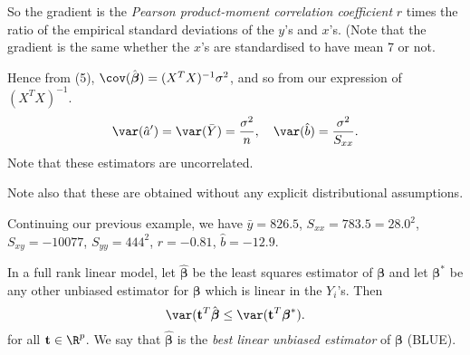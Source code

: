 \documentclass[a4paper]{article}
\begin{document}
So the gradient is the \emph{Pearson product-moment correlation coefficient} $r$ times the ratio of the empirical standard deviations of the $y$'s and $x$'s. (Note that the gradient is the same whether the $x$'s are standardised to have mean 7 or not.

Hence from (5),  $\cov(\hat{\boldsymbol\beta}) = (X^TX)^{-1}\sigma^2$, and so from our expression of $(X^TX)^{-1}$.
\[
  \var(\hat{a}') = \var (\bar Y) = \frac{\sigma^2}{n}, \quad\var(\hat{b}) = \frac{\sigma^2}{S_{xx}}.
\]
Note that these estimators are uncorrelated.

Note also that these are obtained without any explicit distributional assumptions.

\begin{eg}
  Continuing our previous example, we have $\bar y = 826.5$, $S_{xx} = 783.5 = 28.0^2$, $S_{xy} = -10077$, $S_{yy} = 444^2$, $r = -0.81$, $\hat b = -12.9$.
\end{eg}

\begin{thm}
  In a full rank linear model, let $\hat{\boldsymbol\beta}$ be the least squares estimator of $\boldsymbol\beta$ and let $\boldsymbol\beta^*$ be any other unbiased estimator for $\boldsymbol\beta$ which is linear in the $Y_i$'s. Then
  \[
    \var(\mathbf{t}^T\hat{\boldsymbol\beta} \leq \var (\mathbf{t}^T\boldsymbol\beta^*).
  \]
  for all $\mathbf{t}\in \R^p$. We say that $\hat{\boldsymbol\beta}$ is the \emph{best linear unbiased estimator} of $\boldsymbol\beta$ (BLUE).
\end{thm}
\end{document}
